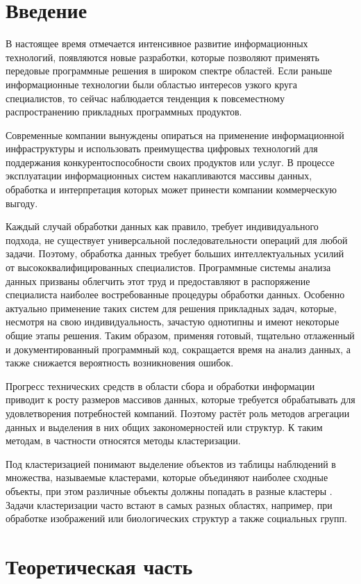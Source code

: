 \documentclass[12pt,twoside,a4paper,border=5]{refart}
\begin{document}
	\begin{titlepage}
		
	\end{titlepage}
	
	\tableofcontents 
	
	\newpage
	
	\section{Введение}
		В настоящее время отмечается интенсивное развитие информационных технологий, появляются новые разработки, которые позволяют применять передовые программные решения в широком спектре областей. Если раньше информационные технологии были областью интересов узкого круга специалистов, то сейчас наблюдается тенденция к повсеместному распространению прикладных программных продуктов. 
		
		Современные компании вынуждены опираться на применение информационной инфраструктуры и использовать преимущества цифровых технологий для поддержания конкурентоспособности своих продуктов или услуг. В процессе эксплуатации информационных систем накапливаются массивы данных, обработка и интерпретация которых может принести компании коммерческую выгоду. 
		
		Каждый случай обработки данных как правило, требует индивидуального подхода, не существует универсальной последовательности операций для любой задачи. Поэтому, обработка данных требует больших интеллектуальных усилий от высококвалифицированных специалистов. Программные системы анализа данных призваны облегчить этот труд и предоставляют в распоряжение специалиста наиболее востребованные процедуры обработки данных. Особенно актуально применение таких систем для решения прикладных задач, которые, несмотря на свою индивидуальность, зачастую однотипны и имеют некоторые общие этапы решения. Таким образом, применяя готовый, тщательно отлаженный и документированный программный код, сокращается время на анализ данных, а также снижается вероятность возникновения ошибок. 

		Прогресс технических средств в области сбора и обработки информации приводит к росту размеров массивов данных, которые требуется обрабатывать для удовлетворения потребностей компаний. Поэтому растёт роль методов агрегации данных и выделения в них общих закономерностей или структур. К таким методам, в частности относятся методы кластеризации. 
		
		Под кластеризацией понимают выделение объектов из таблицы наблюдений в множества, называемые кластерами, которые объединяют наиболее сходные объекты, при этом различные объекты должны попадать в разные кластеры \cite{mirkin-ds}. Задачи кластеризации часто встают в самых разных областях, например, при обработке изображений или биологических структур а также социальных групп.

		
	\section{Теоретическая часть}
	
	\newpage
	
	
\end{document}
